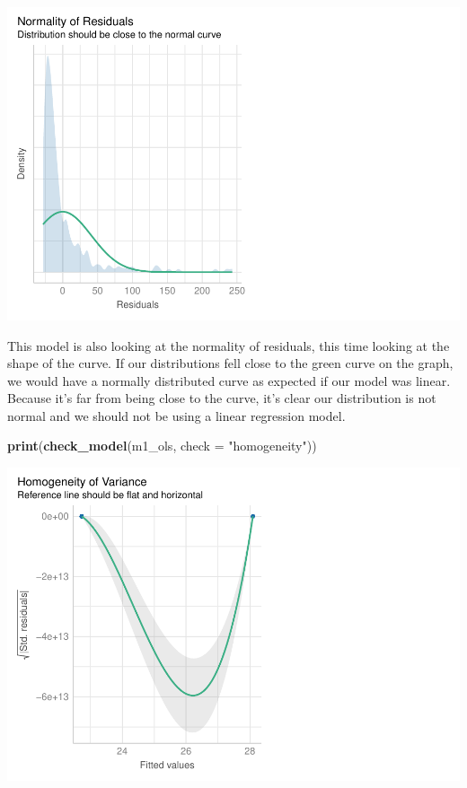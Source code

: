 \documentclass[
]{article}
\newenvironment{Shaded}{\begin{snugshade}}{\end{snugshade}}
\newcommand{\AttributeTok}[1]{\textcolor[rgb]{0.13,0.29,0.53}{#1}}
\newcommand{\FunctionTok}[1]{\textcolor[rgb]{0.13,0.29,0.53}{\textbf{#1}}}
\newcommand{\NormalTok}[1]{#1}
\newcommand{\StringTok}[1]{\textcolor[rgb]{0.31,0.60,0.02}{#1}}
\begin{document}
\includegraphics{hw1-lobstrs-eds241_files/figure-latex/unnamed-chunk-9-1.pdf}

This model is also looking at the normality of residuals, this time
looking at the shape of the curve. If our distributions fell close to
the green curve on the graph, we would have a normally distributed curve
as expected if our model was linear. Because it's far from being close
to the curve, it's clear our distribution is not normal and we should
not be using a linear regression model.

\begin{Shaded}
\begin{Highlighting}[]
\FunctionTok{print}\NormalTok{(}\FunctionTok{check\_model}\NormalTok{(m1\_ols, }\AttributeTok{check =} \StringTok{"homogeneity"}\NormalTok{))}
\end{Highlighting}
\end{Shaded}

\includegraphics{hw1-lobstrs-eds241_files/figure-latex/unnamed-chunk-10-1.pdf}
\end{document}

